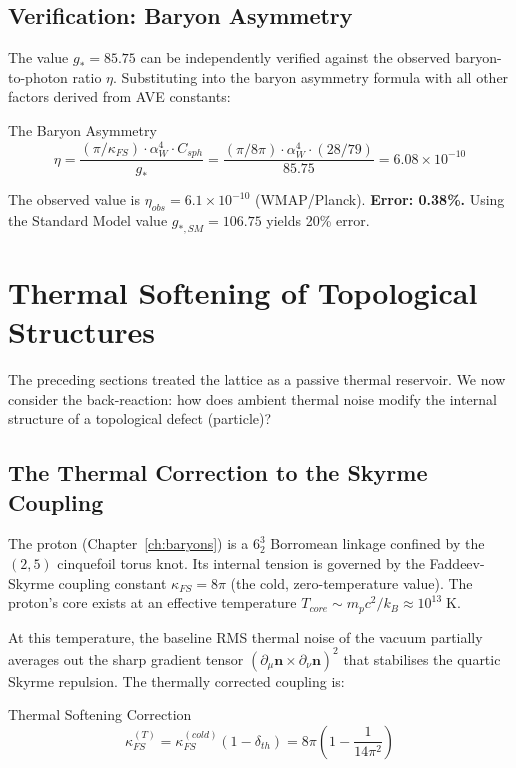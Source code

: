 \subsection{Verification: Baryon Asymmetry}

The value $g_* = 85.75$ can be independently verified against the observed baryon-to-photon ratio $\eta$. Substituting into the baryon asymmetry formula with all other factors derived from AVE constants:
\begin{resultbox}{The Baryon Asymmetry}
\begin{equation}
    \eta = \frac{(\pi / \kappa_{FS}) \cdot \alpha_W^4 \cdot C_{sph}}{g_*} = \frac{(\pi / 8\pi) \cdot \alpha_W^4 \cdot (28/79)}{85.75} = 6.08 \times 10^{-10}
    \label{eq:baryon_asymmetry}
\end{equation}
\end{resultbox}
The observed value is $\eta_{obs} = 6.1 \times 10^{-10}$ (WMAP/Planck). \textbf{Error: 0.38\%.} Using the Standard Model value $g_{*,SM} = 106.75$ yields 20\% error.

\section{Thermal Softening of Topological Structures}
\label{sec:thermal_softening_thermo}

The preceding sections treated the lattice as a passive thermal reservoir. We now consider the back-reaction: how does ambient thermal noise modify the internal structure of a topological defect (particle)?

\subsection{The Thermal Correction to the Skyrme Coupling}

The proton (Chapter~\ref{ch:baryons}) is a $6_2^3$ Borromean linkage confined by the $(2,5)$ cinquefoil torus knot. Its internal tension is governed by the Faddeev-Skyrme coupling constant $\kappa_{FS} = 8\pi$ (the cold, zero-temperature value). The proton's core exists at an effective temperature $T_{core} \sim m_p c^2 / k_B \approx 10^{13}\;\text{K}$.

At this temperature, the baseline RMS thermal noise of the vacuum partially averages out the sharp gradient tensor $(\partial_\mu \mathbf{n} \times \partial_\nu \mathbf{n})^2$ that stabilises the quartic Skyrme repulsion. The thermally corrected coupling is:
\begin{resultbox}{Thermal Softening Correction}
\begin{equation}
    \kappa_{FS}^{(T)} = \kappa_{FS}^{(cold)} (1 - \delta_{th}) = 8\pi \left(1 - \frac{1}{14\pi^2}\right)
    \label{eq:thermal_kappa}
\end{equation}
\end{resultbox}

